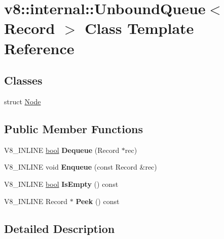 \hypertarget{classv8_1_1internal_1_1UnboundQueue}{}\section{v8\+:\+:internal\+:\+:Unbound\+Queue$<$ Record $>$ Class Template Reference}
\label{classv8_1_1internal_1_1UnboundQueue}
\subsection*{Classes}
\begin{DoxyCompactItemize}
\item 
struct \mbox{\hyperlink{structv8_1_1internal_1_1UnboundQueue_1_1Node}{Node}}
\end{DoxyCompactItemize}
\subsection*{Public Member Functions}
\begin{DoxyCompactItemize}
\item 
\mbox{\label{classv8_1_1internal_1_1UnboundQueue_ac9829855d4a29022ddfecf9b6d852f5d}} 
V8\+\_\+\+I\+N\+L\+I\+NE \mbox{\hyperlink{classbool}{bool}} {\bfseries Dequeue} (Record $\ast$rec)
\item 
\mbox{\label{classv8_1_1internal_1_1UnboundQueue_ad5c2db1c1347765ebe66285616ff3032}} 
V8\+\_\+\+I\+N\+L\+I\+NE void {\bfseries Enqueue} (const Record \&rec)
\item 
\mbox{\label{classv8_1_1internal_1_1UnboundQueue_a1cfe25778e3981e9a77bff3a729fc1b7}} 
V8\+\_\+\+I\+N\+L\+I\+NE \mbox{\hyperlink{classbool}{bool}} {\bfseries Is\+Empty} () const
\item 
\mbox{\label{classv8_1_1internal_1_1UnboundQueue_a0a36e9d0f7fa74c96b8a0211a7d95185}} 
V8\+\_\+\+I\+N\+L\+I\+NE Record $\ast$ {\bfseries Peek} () const
\end{DoxyCompactItemize}


\subsection{Detailed Description}
